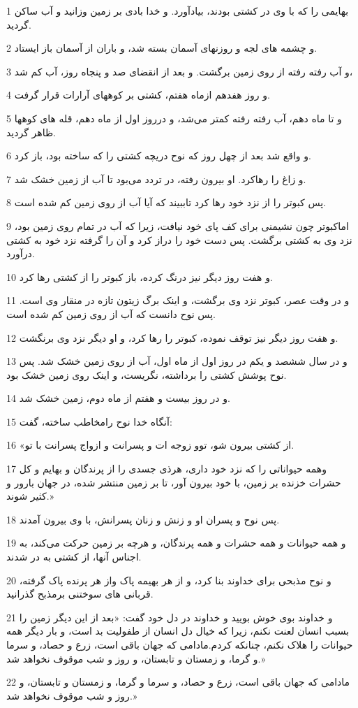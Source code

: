 \par 1 بهایمی را که با وی در کشتی بودند، بیادآورد. و خدا بادی بر زمین وزانید و آب ساکن گردید.
\par 2 و چشمه های لجه و روزنهای آسمان بسته شد، و باران از آسمان باز ایستاد.
\par 3 و آب رفته رفته از روی زمین برگشت. و بعد از انقضای صد و پنجاه روز، آب کم شد،
\par 4 و روز هفدهم ازماه هفتم، کشتی بر کوههای آرارات قرار گرفت.
\par 5 و تا ماه دهم، آب رفته رفته کمتر می‌شد، و درروز اول از ماه دهم، قله های کوهها ظاهر گردید.
\par 6 و واقع شد بعد از چهل روز که نوح دریچه کشتی را که ساخته بود، باز کرد.
\par 7 و زاغ را رهاکرد. او بیرون رفته، در تردد می‌بود تا آب از زمین خشک شد.
\par 8 پس کبوتر را از نزد خود رها کرد تاببیند که آیا آب از روی زمین کم شده است.
\par 9 اماکبوتر چون نشیمنی برای کف پای خود نیافت، زیرا که آب در تمام روی زمین بود، نزد وی به کشتی برگشت. پس دست خود را دراز کرد و آن را گرفته نزد خود به کشتی در‌آورد.
\par 10 و هفت روز دیگر نیز درنگ کرده، باز کبوتر را از کشتی رها کرد.
\par 11 و در وقت عصر، کبوتر نزد وی برگشت، و اینک برگ زیتون تازه در منقار وی است. پس نوح دانست که آب از روی زمین کم شده است.
\par 12 و هفت روز دیگر نیز توقف نموده، کبوتر را رها کرد، و او دیگر نزد وی برنگشت.
\par 13 و در سال ششصد و یکم در روز اول از ماه اول، آب از روی زمین خشک شد. پس نوح پوشش کشتی را برداشته، نگریست، و اینک روی زمین خشک بود.
\par 14 و در روز بیست و هفتم از ماه دوم، زمین خشک شد.
\par 15 آنگاه خدا نوح رامخاطب ساخته، گفت:
\par 16 «از کشتی بیرون شو، توو زوجه ات و پسرانت و ازواج پسرانت با تو.
\par 17 وهمه حیواناتی را که نزد خود داری، هرذی جسدی را از پرندگان و بهایم و کل حشرات خزنده بر زمین، با خود بیرون آور، تا بر زمین منتشر شده، در جهان بارور و کثیر شوند.»
\par 18 پس نوح و پسران او و زنش و زنان پسرانش، با وی بیرون آمدند.
\par 19 و همه حیوانات و همه حشرات و همه پرندگان، و هر‌چه بر زمین حرکت می‌کند، به اجناس آنها، از کشتی به در شدند.
\par 20 و نوح مذبحی برای خداوند بنا کرد، و از هر بهیمه پاک واز هر پرنده پاک گرفته، قربانی های سوختنی برمذبح گذرانید. 
\par 21 و خداوند بوی خوش بویید و خداوند در دل خود گفت: «بعد از این دیگر زمین را بسبب انسان لعنت نکنم، زیرا که خیال دل انسان از طفولیت بد است، و بار دیگر همه حیوانات را هلاک نکنم، چنانکه کردم.مادامی که جهان باقی است، زرع و حصاد، و سرما و گرما، و زمستان و تابستان، و روز و شب موقوف نخواهد شد.»
\par 22 مادامی که جهان باقی است، زرع و حصاد، و سرما و گرما، و زمستان و تابستان، و روز و شب موقوف نخواهد شد.»
 
